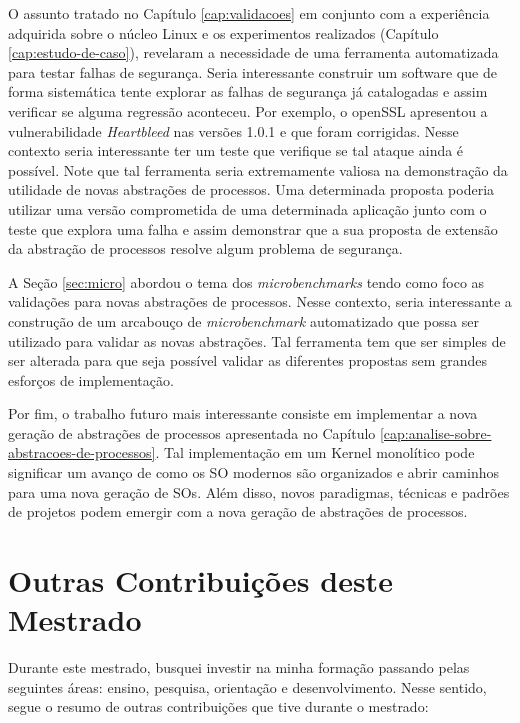 O assunto tratado no Capítulo \ref{cap:validacoes} em conjunto com a experiência adquirida sobre o
núcleo Linux e os experimentos realizados (Capítulo \ref{cap:estudo-de-caso}),
revelaram a necessidade de uma ferramenta automatizada para testar falhas de
segurança. Seria interessante construir um software que de forma sistemática
tente explorar as falhas de segurança já catalogadas e assim verificar se
alguma regressão aconteceu. Por exemplo, o openSSL apresentou a vulnerabilidade
\textit{Heartbleed} nas versões 1.0.1 e que foram corrigidas. Nesse contexto
seria interessante ter um teste que verifique se tal ataque ainda é possível.
Note que tal ferramenta seria extremamente valiosa na demonstração da utilidade
de novas abstrações de processos. Uma determinada proposta poderia utilizar uma
versão comprometida de uma determinada aplicação junto com o teste que explora
uma falha e assim demonstrar que a sua proposta de extensão da abstração de
processos resolve algum problema de segurança.

A Seção \ref{sec:micro} abordou o tema dos \textit{microbenchmarks} tendo como
foco as validações para novas abstrações de processos. Nesse contexto, seria
interessante a construção de um arcabouço de \textit{microbenchmark}
automatizado que possa ser utilizado para validar as novas abstrações. Tal
ferramenta tem que ser simples de ser alterada para que seja possível validar
as diferentes propostas sem grandes esforços de implementação.

Por fim, o trabalho futuro mais interessante consiste em implementar a nova
geração de abstrações de processos apresentada no Capítulo
\ref{cap:analise-sobre-abstracoes-de-processos}. Tal implementação
em um Kernel monolítico pode significar um avanço de como os SO modernos são
organizados e abrir caminhos para uma nova geração de SOs. Além disso, novos
paradigmas, técnicas e padrões de projetos podem emergir com a nova
geração de abstrações de processos.

\section{Outras Contribuições deste Mestrado}

Durante este mestrado, busquei investir na minha formação passando pelas
seguintes áreas: ensino, pesquisa, orientação e desenvolvimento. Nesse sentido,
segue o resumo de outras contribuições que tive durante o mestrado:

